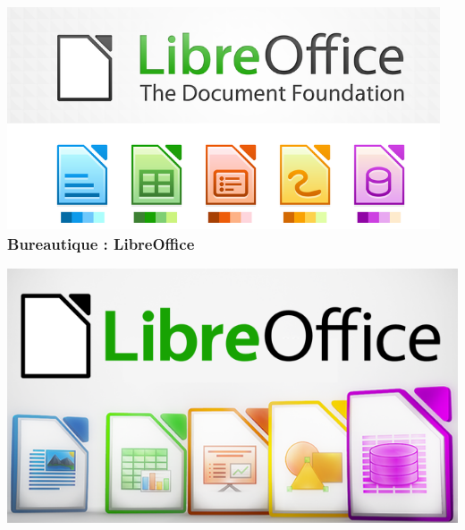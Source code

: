 \documentclass{beamer}
\begin{document}
\begin{frame}
\frametitle{\includegraphics[scale=0.2] {./images/libreoffice.png}~ Bureautique : LibreOffice}
\begin{center}
\includegraphics[scale=0.4] {./images/libreoffice_complet.png} 
\end{center}
\end{frame}
\end{document}
